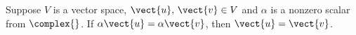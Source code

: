 Suppose $V$ is a vector space, $\vect{u},\,\vect{v}\in V$ and $\alpha$ is a nonzero scalar from $\complex{\null}$. If $\alpha\vect{u}=\alpha\vect{v}$, then $\vect{u}=\vect{v}$.
